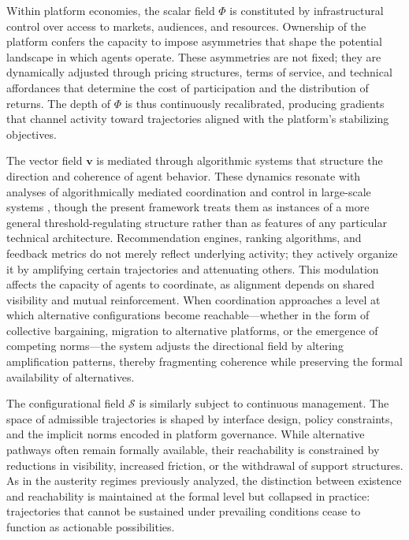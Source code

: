 \documentclass[11pt, a4paper]{article}
\begin{document}
Within platform economies, the scalar field $\Phi$ is constituted by infrastructural control over access to markets, audiences, and resources. Ownership of the platform confers the capacity to impose asymmetries that shape the potential landscape in which agents operate. These asymmetries are not fixed; they are dynamically adjusted through pricing structures, terms of service, and technical affordances that determine the cost of participation and the distribution of returns. The depth of $\Phi$ is thus continuously recalibrated, producing gradients that channel activity toward trajectories aligned with the platform's stabilizing objectives.

The vector field $\mathbf{v}$ is mediated through algorithmic systems that structure the direction and coherence of agent behavior. These dynamics resonate with analyses of algorithmically mediated coordination and control in large-scale systems \cite{goodfellow2016}, though the present framework treats them as instances of a more general threshold-regulating structure rather than as features of any particular technical architecture. Recommendation engines, ranking algorithms, and feedback metrics do not merely reflect underlying activity; they actively organize it by amplifying certain trajectories and attenuating others. This modulation affects the capacity of agents to coordinate, as alignment depends on shared visibility and mutual reinforcement. When coordination approaches a level at which alternative configurations become reachable---whether in the form of collective bargaining, migration to alternative platforms, or the emergence of competing norms---the system adjusts the directional field by altering amplification patterns, thereby fragmenting coherence while preserving the formal availability of alternatives.

The configurational field $\mathcal{S}$ is similarly subject to continuous management. The space of admissible trajectories is shaped by interface design, policy constraints, and the implicit norms encoded in platform governance. While alternative pathways often remain formally available, their reachability is constrained by reductions in visibility, increased friction, or the withdrawal of support structures. As in the austerity regimes previously analyzed, the distinction between existence and reachability is maintained at the formal level but collapsed in practice: trajectories that cannot be sustained under prevailing conditions cease to function as actionable possibilities.
\end{document}
